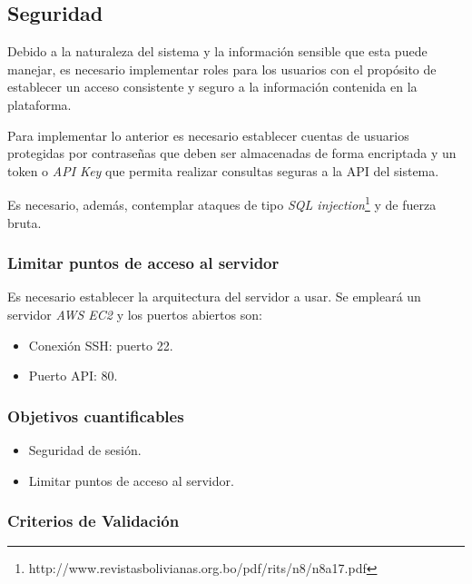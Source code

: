 \subsection{Seguridad}

Debido a la naturaleza del sistema y la información sensible que esta puede manejar, es necesario implementar roles para los usuarios con el propósito de establecer un acceso consistente y seguro a la información contenida en la plataforma. 

Para implementar lo anterior es necesario establecer cuentas de usuarios protegidas por contraseñas que deben ser almacenadas de forma encriptada y un token o \textit{API Key} que permita realizar consultas seguras a la API del sistema.

Es necesario, además, contemplar ataques de tipo \textit{SQL injection}\footnote{http://www.revistasbolivianas.org.bo/pdf/rits/n8/n8a17.pdf}  y de fuerza bruta.


\subsubsection{Limitar puntos de acceso al servidor}

Es necesario establecer la arquitectura del servidor a usar. Se empleará un servidor \textit{AWS EC2} y los puertos abiertos son: 
\begin{itemize}
	\item
	Conexión SSH: puerto 22.
	\item
	Puerto API: 80.
\end{itemize}

\subsubsection{Objetivos cuantificables}

\begin{itemize}
	\item
	Seguridad de sesión.
	\item
	Limitar puntos de acceso al servidor.
\end{itemize}

\subsubsection{Criterios de Validación}

